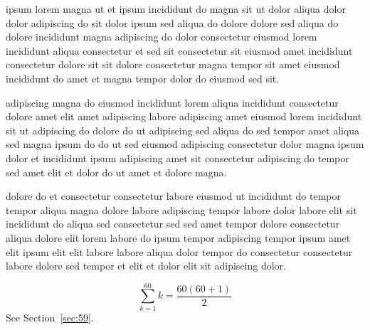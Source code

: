 \documentclass{article}
\begin{document}
ipsum lorem magna ut et ipsum incididunt do magna sit ut dolor aliqua dolor dolor adipiscing do sit dolor ipsum sed aliqua do dolore dolore sed aliqua do dolore incididunt magna adipiscing do dolor consectetur eiusmod lorem incididunt aliqua consectetur et sed sit consectetur sit eiusmod amet incididunt consectetur dolore sit sit dolore consectetur magna tempor sit amet eiusmod incididunt do amet et magna tempor dolor do eiusmod sed sit.

adipiscing magna do eiusmod incididunt lorem aliqua incididunt consectetur dolore amet elit amet adipiscing labore adipiscing amet eiusmod lorem incididunt sit ut adipiscing do dolore do ut adipiscing sed aliqua do sed tempor amet aliqua sed magna ipsum do do ut sed eiusmod adipiscing consectetur dolor magna ipsum dolor et incididunt ipsum adipiscing amet sit consectetur adipiscing do tempor sed amet elit et dolor do ut amet et dolore magna.

dolore do et consectetur consectetur labore eiusmod ut incididunt do tempor tempor aliqua magna dolore labore adipiscing tempor labore dolor labore elit sit incididunt do aliqua sed consectetur sed sed amet tempor dolore consectetur aliqua dolore elit lorem labore do ipsum tempor adipiscing tempor ipsum amet elit ipsum elit elit labore labore aliqua dolor tempor do consectetur consectetur labore dolore sed tempor et elit et dolor elit sit adipiscing dolor.

\begin{equation} \sum_{k=1}^{60} k = \frac{60(60+1)}{2} \end{equation}
See Section~\ref{sec:59}.
\end{document}
